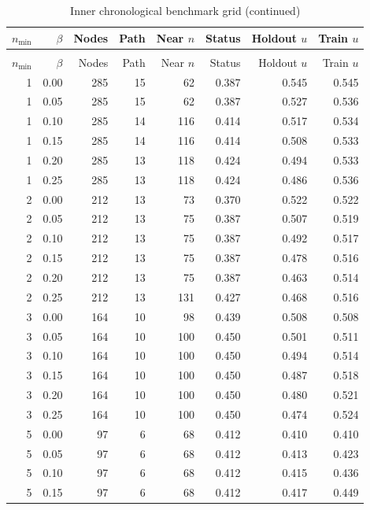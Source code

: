 \begingroup\small\setlength{\tabcolsep}{3pt}
\begin{longtable}{@{}rrrrrrrr@{}}
\caption{Inner chronological benchmark grid}\label{tab:s6}\\
\toprule
$n_{\min}$ & $\beta$ & Nodes & Path & Near $n$ & Status & Holdout $u$ & Train $u$\\
\midrule
\endfirsthead
\caption[]{Inner chronological benchmark grid (continued)}\\
\toprule
$n_{\min}$ & $\beta$ & Nodes & Path & Near $n$ & Status & Holdout $u$ & Train $u$\\
\midrule
\endhead
1 & 0.00 & 285 & 15 & 62 & 0.387 & 0.545 & 0.545\\
1 & 0.05 & 285 & 15 & 62 & 0.387 & 0.527 & 0.536\\
1 & 0.10 & 285 & 14 & 116 & 0.414 & 0.517 & 0.534\\
1 & 0.15 & 285 & 14 & 116 & 0.414 & 0.508 & 0.533\\
1 & 0.20 & 285 & 13 & 118 & 0.424 & 0.494 & 0.533\\
1 & 0.25 & 285 & 13 & 118 & 0.424 & 0.486 & 0.536\\
2 & 0.00 & 212 & 13 & 73 & 0.370 & 0.522 & 0.522\\
2 & 0.05 & 212 & 13 & 75 & 0.387 & 0.507 & 0.519\\
2 & 0.10 & 212 & 13 & 75 & 0.387 & 0.492 & 0.517\\
2 & 0.15 & 212 & 13 & 75 & 0.387 & 0.478 & 0.516\\
2 & 0.20 & 212 & 13 & 75 & 0.387 & 0.463 & 0.514\\
2 & 0.25 & 212 & 13 & 131 & 0.427 & 0.468 & 0.516\\
3 & 0.00 & 164 & 10 & 98 & 0.439 & 0.508 & 0.508\\
3 & 0.05 & 164 & 10 & 100 & 0.450 & 0.501 & 0.511\\
3 & 0.10 & 164 & 10 & 100 & 0.450 & 0.494 & 0.514\\
3 & 0.15 & 164 & 10 & 100 & 0.450 & 0.487 & 0.518\\
3 & 0.20 & 164 & 10 & 100 & 0.450 & 0.480 & 0.521\\
3 & 0.25 & 164 & 10 & 100 & 0.450 & 0.474 & 0.524\\
5 & 0.00 & 97 & 6 & 68 & 0.412 & 0.410 & 0.410\\
5 & 0.05 & 97 & 6 & 68 & 0.412 & 0.413 & 0.423\\
5 & 0.10 & 97 & 6 & 68 & 0.412 & 0.415 & 0.436\\
5 & 0.15 & 97 & 6 & 68 & 0.412 & 0.417 & 0.449\\

\end{longtable}
